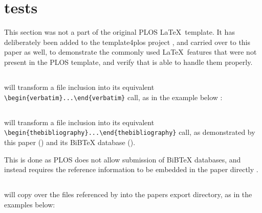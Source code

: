 \section*{ tests}

This section was not a part of the original PLOS \LaTeX~template.
It has deliberately been added to the template4plos project \cite{template4plos}, and carried over to this paper as well, to demonstrate the commonly used \LaTeX~features that were not present in the PLOS template, and verify that  is able to handle them properly.

\subsection*{}

 will transform a \verb|| file inclusion into its equivalent \verb|\begin{verbatim}...\end{verbatim}| call, as in the example below \cite{Project:friendly_name_mixin:CodeRepository}:



\subsection*{}

 will transform a \verb|| file inclusion into its equivalent \verb|\begin{thebibliography}...\end{thebibliography}| call, as demonstrated by this paper () and its BiBTeX database ().

This is done as PLOS does not allow submission of BiBTeX databases, and instead requires the reference information to be embedded in the paper directly \cite{PLOS:LaTeX}.

\subsection*{}

 will copy over the files referenced by \verb|| into the papers export directory, as in the examples below:

